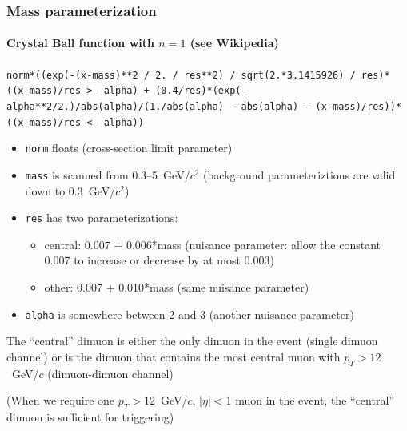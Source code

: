 \documentclass[compress]{beamer}
\begin{document}
\begin{frame}
\frametitle{Mass parameterization}
\framesubtitle{Crystal Ball function with $n=1$ (see Wikipedia)}

{\tt \tiny norm*((exp(-(x-mass)**2 / 2. / res**2) / sqrt(2.*3.1415926) / res)*((x-mass)/res > -alpha) + (0.4/res)*(exp(-alpha**2/2.)/abs(alpha)/(1./abs(alpha) - abs(alpha) - (x-mass)/res))*((x-mass)/res < -alpha))}

\begin{itemize}
\item {\tt norm} floats (cross-section limit parameter)
\item {\tt mass} is scanned from 0.3--5~GeV/$c^2$ (background
  parameteriztions are valid down to 0.3~GeV/$c^2$)
\item {\tt res} has two parameterizations:
\begin{itemize}
\item central: 0.007 + 0.006*mass {\scriptsize (nuisance parameter: allow the constant 0.007 to increase or decrease by at most 0.003)}

\item other: 0.007 + 0.010*mass {\scriptsize (same nuisance parameter)}

\end{itemize}
\item {\tt alpha} is somewhere between 2 and 3 {\scriptsize (another nuisance parameter)}
\end{itemize}

The ``central'' dimuon is either the only dimuon in the event (single dimuon channel) or is the dimuon that contains the most central muon with $p_T > 12$~GeV/$c$ (dimuon-dimuon channel)

{\scriptsize (When we require one $p_T > 12$~GeV/$c$, $|\eta| < 1$ muon in the event, the ``central'' dimuon is sufficient for triggering)}
\end{frame}

\end{document}
